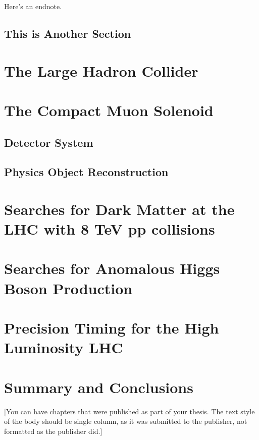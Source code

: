\documentclass[12pt]{caltech_thesis}
\begin{document}
\lipsum[3] 

\lipsum[4-5] 

Here's an endnote.

\section{This is Another Section}
\lipsum[6-7] 

\chapter{The Large Hadron Collider}

\chapter{The Compact Muon Solenoid}
\section{Detector System}

\section{Physics Object Reconstruction}

\chapter{Searches for Dark Matter at the LHC with 8 TeV pp collisions}

\chapter{Searches for Anomalous Higgs Boson Production}

\chapter{Precision Timing for the High Luminosity LHC}

\chapter{Summary and Conclusions}


[You can have chapters that were published as part of your thesis. The
text style of the body should be single column, as it was submitted to
the publisher, not formatted as the publisher did.]
\end{document}

